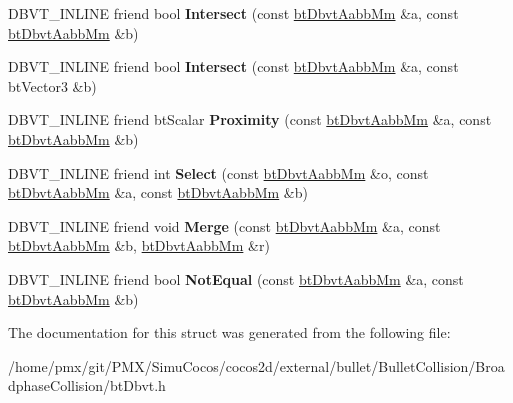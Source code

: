 \begin{DoxyCompactItemize}
\mbox{\label{structbtDbvtAabbMm_a58901e7699bdc88aa0a4e7d6e1200156}} 
D\+B\+V\+T\+\_\+\+I\+N\+L\+I\+NE friend bool {\bfseries Intersect} (const \hyperlink{structbtDbvtAabbMm}{bt\+Dbvt\+Aabb\+Mm} \&a, const \hyperlink{structbtDbvtAabbMm}{bt\+Dbvt\+Aabb\+Mm} \&b)
\item 
\mbox{\label{structbtDbvtAabbMm_a908648b3fc05f022df71dc8809257253}} 
D\+B\+V\+T\+\_\+\+I\+N\+L\+I\+NE friend bool {\bfseries Intersect} (const \hyperlink{structbtDbvtAabbMm}{bt\+Dbvt\+Aabb\+Mm} \&a, const bt\+Vector3 \&b)
\item 
\mbox{\label{structbtDbvtAabbMm_ab07b0b13aaf7c4f84e4c5a603611602c}} 
D\+B\+V\+T\+\_\+\+I\+N\+L\+I\+NE friend bt\+Scalar {\bfseries Proximity} (const \hyperlink{structbtDbvtAabbMm}{bt\+Dbvt\+Aabb\+Mm} \&a, const \hyperlink{structbtDbvtAabbMm}{bt\+Dbvt\+Aabb\+Mm} \&b)
\item 
\mbox{\label{structbtDbvtAabbMm_a57d49ba44a56803bbd93cf591fa72ec9}} 
D\+B\+V\+T\+\_\+\+I\+N\+L\+I\+NE friend int {\bfseries Select} (const \hyperlink{structbtDbvtAabbMm}{bt\+Dbvt\+Aabb\+Mm} \&o, const \hyperlink{structbtDbvtAabbMm}{bt\+Dbvt\+Aabb\+Mm} \&a, const \hyperlink{structbtDbvtAabbMm}{bt\+Dbvt\+Aabb\+Mm} \&b)
\item 
\mbox{\label{structbtDbvtAabbMm_a6b632dafd4f19b6b91b766476c3ae43f}} 
D\+B\+V\+T\+\_\+\+I\+N\+L\+I\+NE friend void {\bfseries Merge} (const \hyperlink{structbtDbvtAabbMm}{bt\+Dbvt\+Aabb\+Mm} \&a, const \hyperlink{structbtDbvtAabbMm}{bt\+Dbvt\+Aabb\+Mm} \&b, \hyperlink{structbtDbvtAabbMm}{bt\+Dbvt\+Aabb\+Mm} \&r)
\item 
\mbox{\label{structbtDbvtAabbMm_a50a983887ecf866dda3b078b5164a331}} 
D\+B\+V\+T\+\_\+\+I\+N\+L\+I\+NE friend bool {\bfseries Not\+Equal} (const \hyperlink{structbtDbvtAabbMm}{bt\+Dbvt\+Aabb\+Mm} \&a, const \hyperlink{structbtDbvtAabbMm}{bt\+Dbvt\+Aabb\+Mm} \&b)
\end{DoxyCompactItemize}


The documentation for this struct was generated from the following file\+:\begin{DoxyCompactItemize}
\item 
/home/pmx/git/\+P\+M\+X/\+Simu\+Cocos/cocos2d/external/bullet/\+Bullet\+Collision/\+Broadphase\+Collision/bt\+Dbvt.\+h\end{DoxyCompactItemize}
